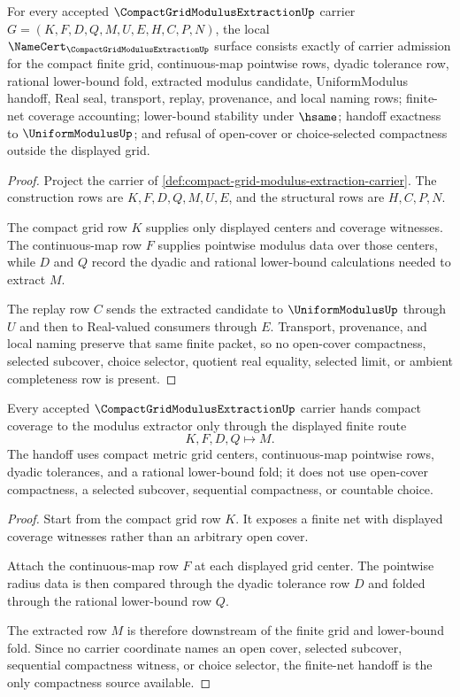 \begin{theorem}
\label{thm:compact-grid-modulus-extraction-namecert-obligations}
For every accepted $\CompactGridModulusExtractionUp$ carrier $G=(K,F,D,Q,M,U,E,H,C,P,N)$, the local $\NameCert_{\CompactGridModulusExtractionUp}$ surface consists exactly of carrier admission for the compact finite grid, continuous-map pointwise rows, dyadic tolerance row, rational lower-bound fold, extracted modulus candidate, UniformModulus handoff, Real seal, transport, replay, provenance, and local naming rows; finite-net coverage accounting; lower-bound stability under $\hsame$; handoff exactness to $\UniformModulusUp$; and refusal of open-cover or choice-selected compactness outside the displayed grid.
\end{theorem}
\begin{proof}
Project the carrier of \autoref{def:compact-grid-modulus-extraction-carrier}. The construction rows are $K,F,D,Q,M,U,E$, and the structural rows are $H,C,P,N$.

The compact grid row $K$ supplies only displayed centers and coverage witnesses. The continuous-map row $F$ supplies pointwise modulus data over those centers, while $D$ and $Q$ record the dyadic and rational lower-bound calculations needed to extract $M$.

The replay row $C$ sends the extracted candidate to $\UniformModulusUp$ through $U$ and then to Real-valued consumers through $E$. Transport, provenance, and local naming preserve that same finite packet, so no open-cover compactness, selected subcover, choice selector, quotient real equality, selected limit, or ambient completeness row is present.
\end{proof}

\begin{theorem}
\label{thm:compact-grid-modulus-extraction-finite-net-handoff}
Every accepted $\CompactGridModulusExtractionUp$ carrier hands compact coverage to the modulus extractor only through the displayed finite route
$$
K,F,D,Q \longmapsto M .
$$
The handoff uses compact metric grid centers, continuous-map pointwise rows, dyadic tolerances, and a rational lower-bound fold; it does not use open-cover compactness, a selected subcover, sequential compactness, or countable choice.
\end{theorem}
\begin{proof}
Start from the compact grid row $K$. It exposes a finite net with displayed coverage witnesses rather than an arbitrary open cover.

Attach the continuous-map row $F$ at each displayed grid center. The pointwise radius data is then compared through the dyadic tolerance row $D$ and folded through the rational lower-bound row $Q$.

The extracted row $M$ is therefore downstream of the finite grid and lower-bound fold. Since no carrier coordinate names an open cover, selected subcover, sequential compactness witness, or choice selector, the finite-net handoff is the only compactness source available.
\end{proof}

